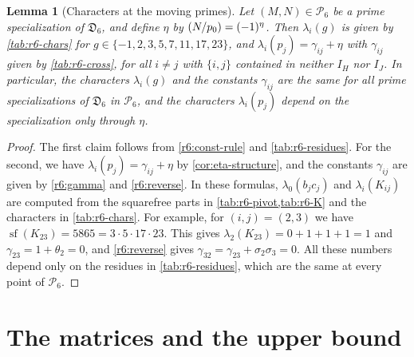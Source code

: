 \documentclass[12pt,oneside,openany]{book}
\theoremstyle{definition}
\theoremstyle{plain}
\numberwithin{equation}{chapter}
\theoremstyle{plain}
\newtheorem{lemma}[lemma]{Lemma}
\theoremstyle{definition}
\theoremstyle{remark}
\newcommand{\leg}[2]{\mathchoice{\left(\frac{#1}{#2}\right)}{(#1/#2)}{(#1/#2)}{(#1/#2)}}
\newcommand{\datum}{\mathfrak D}
\newcommand{\cP}{\mathcal P}
\begin{document}
\begin{lemma}[Characters at the moving primes]\label{lem:r6-characters}
Let $(M,N)\in\cP_6$ be a prime specialization of $\datum_6$, and define $\eta$ by $\leg{N}{p_0}=(-1)^\eta$. Then $\lambda_i(g)$ is given by \cref{tab:r6-chars} for $g\in\{-1,2,3,5,7,11,17,23\}$, and $\lambda_i(p_j)=\gamma_{ij}+\eta$ with $\gamma_{ij}$ given by \cref{tab:r6-cross}, for all $i\ne j$ with $\{i,j\}$ contained in neither $I_H$ nor $I_J$. In particular, the characters $\lambda_i(g)$ and the constants $\gamma_{ij}$ are the same for all prime specializations of $\datum_6$ in $\cP_6$, and the characters $\lambda_i(p_j)$ depend on the specialization only through $\eta$.
\end{lemma}

\begin{proof}
The first claim follows from \eqref{r6:const-rule} and \cref{tab:r6-residues}. For the second, we have $\lambda_i(p_j)=\gamma_{ij}+\eta$ by \cref{cor:eta-structure}, and the constants $\gamma_{ij}$ are given by \eqref{r6:gamma} and \eqref{r6:reverse}. In these formulas, $\lambda_0(b_jc_j)$ and $\lambda_i(K_{ij})$ are computed from the squarefree parts in \cref{tab:r6-pivot,tab:r6-K} and the characters in \cref{tab:r6-chars}. For example, for $(i,j)=(2,3)$ we have $\operatorname{sf}(K_{23})=5865=3\cdot5\cdot17\cdot23$. This gives $\lambda_2(K_{23})=0+1+1+1=1$ and $\gamma_{23}=1+\theta_2=0$, and \eqref{r6:reverse} gives $\gamma_{32}=\gamma_{23}+\sigma_2\sigma_3=0$. All these numbers depend only on the residues in \cref{tab:r6-residues}, which are the same at every point of $\cP_6$.
\end{proof}

\section{The matrices and the upper bound}\label{sec:r6-matrices}
\end{document}
